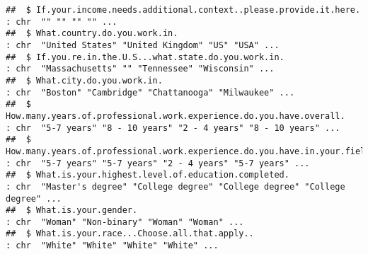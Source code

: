 \documentclass[
]{article}
\begin{document}
\begin{verbatim}
##  $ If.your.income.needs.additional.context..please.provide.it.here.                                                                                                                                                                    : chr  "" "" "" "" ...
##  $ What.country.do.you.work.in.                                                                                                                                                                                                        : chr  "United States" "United Kingdom" "US" "USA" ...
##  $ If.you.re.in.the.U.S...what.state.do.you.work.in.                                                                                                                                                                                   : chr  "Massachusetts" "" "Tennessee" "Wisconsin" ...
##  $ What.city.do.you.work.in.                                                                                                                                                                                                           : chr  "Boston" "Cambridge" "Chattanooga" "Milwaukee" ...
##  $ How.many.years.of.professional.work.experience.do.you.have.overall.                                                                                                                                                                 : chr  "5-7 years" "8 - 10 years" "2 - 4 years" "8 - 10 years" ...
##  $ How.many.years.of.professional.work.experience.do.you.have.in.your.field.                                                                                                                                                           : chr  "5-7 years" "5-7 years" "2 - 4 years" "5-7 years" ...
##  $ What.is.your.highest.level.of.education.completed.                                                                                                                                                                                  : chr  "Master's degree" "College degree" "College degree" "College degree" ...
##  $ What.is.your.gender.                                                                                                                                                                                                                : chr  "Woman" "Non-binary" "Woman" "Woman" ...
##  $ What.is.your.race...Choose.all.that.apply..                                                                                                                                                                                         : chr  "White" "White" "White" "White" ...
\end{verbatim}
\end{document}
